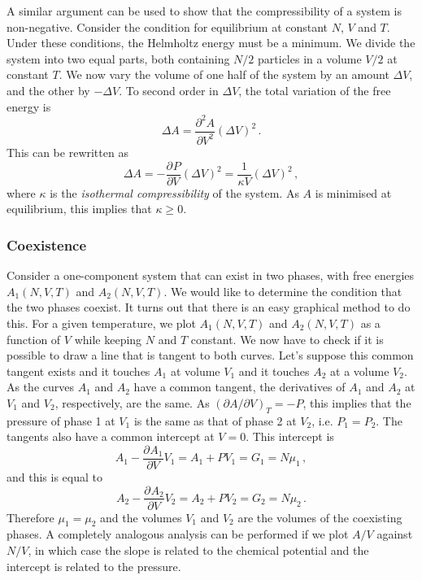 \documentclass{article}
\theoremstyle{plain}\theoremheaderfont{\normalfont\bfseries}\theorembodyfont{\rmfamily}\theoremseparator{.}\newtheorem*{thm}{Theorem}\newtheorem*{law}{Law}\newtheorem*{pos}{Postulate}
\numberwithin{equation}{section}
\newcommand{\pdv}[3][]{\frac{\partial^{#1} #2}{{\partial #3}^{#1}}}
\begin{document}
    A similar argument can be used to show that the compressibility of a system is non-negative. Consider the condition for equilibrium at constant \(N\), \(V\) and \(T\). Under these conditions, the Helmholtz energy must be a minimum. We divide the system into two equal parts, both containing \(N/2\) particles in a volume \(V/2\) at constant \(T\). We now vary the volume of one half of the system by an amount \(\Delta V\), and the other by \(-\Delta V\). To second order in \(\Delta V\), the total variation of the free energy is
    \begin{equation}
        \Delta A=\pdv[2]{A}{V} (\Delta V)^2\,.
    \end{equation}
    This can be rewritten as
    \begin{equation}
        \Delta A=-\pdv{P}{V}(\Delta V)^2=\frac{1}{\kappa V}(\Delta V)^2\,,
    \end{equation}
    where \(\kappa\) is the \textit{isothermal compressibility} of the system. As \(A\) is minimised at equilibrium, this implies that \(\kappa\ge 0\).

    \subsubsection{Coexistence}
    Consider a one-component system that can exist in two phases, with free energies \(A_1(N,V,T)\) and \(A_2(N,V,T)\). We would like to determine the condition that the two phases coexist. It turns out that there is an easy graphical method to do this. For a given temperature, we plot \(A_1(N,V,T)\) and \(A_2(N,V,T)\) as a function of \(V\) while keeping \(N\) and \(T\) constant. We now have to check if it is possible to draw a line that is tangent to both curves. Let's suppose this common tangent exists and it touches \(A_1\) at volume \(V_1\) and it touches \(A_2\) at a volume \(V_2\). As the curves \(A_1\) and \(A_2\) have a common tangent, the derivatives of \(A_1\) and \(A_2\) at \(V_1\) and \(V_2\), respectively, are the same. As \((\partial A/\partial V)_T=-P\), this implies that the pressure of phase 1 at \(V_1\) is the same as that of phase 2 at \(V_2\), i.e. \(P_1=P_2\). The tangents also have a common intercept at \(V=0\). This intercept is
    \begin{equation}
        A_1-\pdv{A_1}{V}V_1=A_1+PV_1=G_1=N\mu_1\,,
    \end{equation}
    and this is equal to
    \begin{equation}
        A_2-\pdv{A_2}{V}V_2=A_2+PV_2=G_2=N\mu_2\,.
    \end{equation}
    Therefore \(\mu_1=\mu_2\) and the volumes \(V_1\) and \(V_2\) are the volumes of the coexisting phases. A completely analogous analysis can be performed if we plot \(A/V\) against \(N/V\), in which case the slope is related to the chemical potential and the intercept is related to the pressure.
\end{document}
